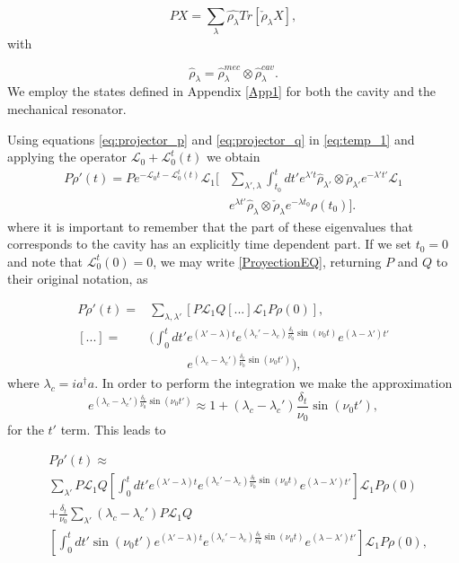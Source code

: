 \documentclass[reprint, amsmath,amssymb, aps,pra]{revtex4-1}
\begin{document}
\begin{equation}
PX =\sum_\lambda \hat{\rho_{\lambda}}Tr[\check{\rho}_{\lambda}X],
\end{equation} with

\begin{equation}
\hat{\rho}_\lambda = \hat{\rho}_\lambda^{mec} \otimes  \hat{\rho}_\lambda^{cav}.
\end{equation} We employ the states defined in Appendix
\ref{App1} for both the cavity and the mechanical resonator. 

Using equations \eqref{eq:projector_p} and \eqref{eq:projector_q} in
\eqref{eq:temp_1} and applying the operator $\mathcal{L}_0+\mathcal{L}_0^t(t)$ we obtain
\begin{align}\label{ProyectionEQ}
P\dot{\rho}'(t)=P e^{-\mathcal{L}_0 t-\mathcal{L}_0^t(t)}\mathcal{L}_1[&\sum_{\lambda',\lambda}\int_{t_0}^{t}dt'e^{\lambda' t} \hat{\rho}_{\lambda'} \otimes \check{\rho}_{\lambda'}e^{-\lambda' t'}\mathcal{L}_1\\
&e^{\lambda t'}\hat{\rho}_{\lambda} \otimes \check{\rho}_{\lambda} e^{-\lambda t_0}\rho(t_0)]\nonumber.
\end{align} where it is important to remember that the part of these eigenvalues that corresponds to the cavity has an explicitly time dependent part. If we  set $t_0=0$ and note that $\mathcal{L}_0^t(0)=0$, we may write \eqref{ProyectionEQ}, returning $P$ and $Q$ to their original notation, as

\begin{align}
P\dot{\rho}'(t)=&\sum_{\lambda,\lambda'}[P \mathcal{L}_1Q[...]\mathcal{L}_1P\rho(0)],\\
[...] =& (\int_0^t dt' e^{(\lambda'-\lambda)t}e^{(\lambda_c'-\lambda_c)\frac{\delta_t}{\nu_0} \sin(\nu_0t)}e^{(\lambda-\lambda')t'}\nonumber \\ 
&\qquad \quad e^{(\lambda_c-\lambda_c')\frac{\delta_t}{\nu_0} \sin(\nu_0t')}),\nonumber
\end{align} where $\lambda_c=ia^\dagger a$. In order to perform the integration we make the approximation
\begin{equation}
e^{(\lambda_c-\lambda_c')\frac{\delta_t}{\nu_0} \sin(\nu_0t')} \approx 1+(\lambda_c-\lambda_c')\frac{\delta_t}{\nu_0} \sin(\nu_0t'),
\end{equation} for the $t'$ term. This leads to

\begin{align}
&P\dot{\rho}'(t)\approx \\
&\sum_{\lambda'}P \mathcal{L}_1Q[\int_0^t dt' e^{(\lambda'-\lambda)t}e^{(\lambda_c'-\lambda_c)\frac{\delta_t}{\nu_0} \sin(\nu_0t)}e^{(\lambda-\lambda')t'}]\mathcal{L}_1P\rho(0)\nonumber \\
&+\frac{\delta_t}{\nu_0}\sum_{\lambda'}(\lambda_c-\lambda_c')P\mathcal{L}_1Q \nonumber\\
&[\int_0^t dt'\sin(\nu_0t') e^{(\lambda'-\lambda)t}e^{(\lambda_c'-\lambda_c)\frac{\delta_t}{\nu_0} \sin(\nu_0t)}e^{(\lambda-\lambda')t'}]\mathcal{L}_1P\rho(0),\nonumber
\end{align}
\end{document}
